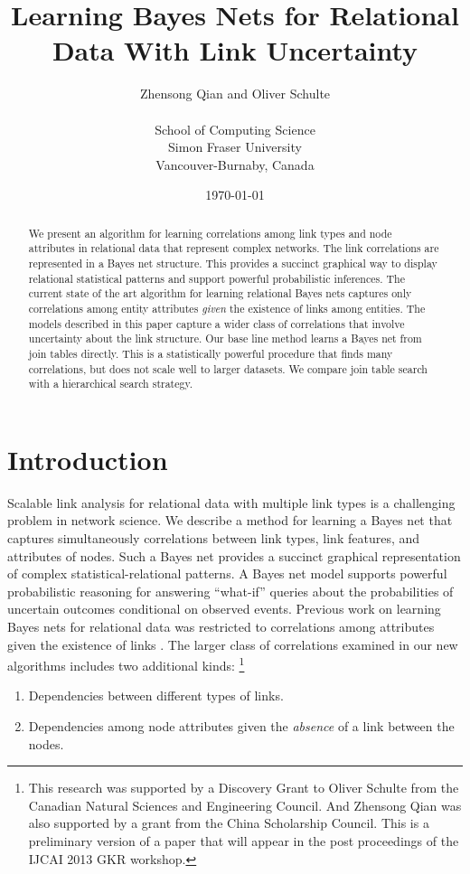 \documentclass{article}
\begin{document}
\title{Learning Bayes Nets for Relational Data With Link Uncertainty}
\author{Zhensong Qian and Oliver Schulte \\
\\ School of Computing Science\\ Simon Fraser University\\Vancouver-Burnaby, Canada}
\date{\today}
\maketitle

\begin{abstract} 
We present an algorithm for learning correlations among link types and node attributes in relational data that represent complex networks. 
The link correlations are represented in a Bayes net structure. This provides a succinct graphical way to display relational statistical patterns and support powerful probabilistic inferences. The current state of the art algorithm for learning relational Bayes nets captures only correlations among entity attributes {\em given} the existence of links among entities. The models described in this paper capture a wider class of correlations that involve uncertainty about the link structure. Our base line method learns a Bayes net from join tables directly. This is  a statistically powerful procedure that finds many correlations, but does not scale well to larger datasets. We compare join table search with a hierarchical search strategy.
\end{abstract}


\section{Introduction} 
Scalable link analysis for relational data with multiple link types is a challenging problem in network science.
 We describe a method for learning a Bayes net that captures simultaneously correlations between link types, link features, and attributes of nodes. Such a Bayes net provides a succinct graphical representation of complex statistical-relational patterns. A  Bayes net model supports powerful probabilistic reasoning for answering ``what-if'' queries about the probabilities of uncertain outcomes conditional on observed events.
Previous work on learning Bayes nets for relational data was restricted to correlations among attributes given the existence of links \cite{Schulte2012}. The larger class of correlations examined in our new algorithms includes two additional kinds:
\footnote{
This research was supported by a Discovery Grant to Oliver Schulte from the Canadian Natural Sciences and Engineering Council. 
And Zhensong Qian was also supported by a grant from the China Scholarship Council.
This is a preliminary version of a paper that will appear in the post proceedings of the IJCAI 2013 GKR workshop.
}
\begin{enumerate}
\item Dependencies between  different types of links.
\item Dependencies among node attributes given the {\em absence} of a link between the nodes.
\end{enumerate}
\end{document}
